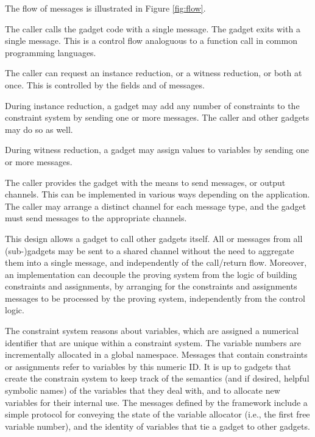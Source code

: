 	The flow of messages is illustrated in Figure \ref{fig:flow}.

	The caller calls the gadget code with a single  message.
	The gadget exits with a single  message.
	This is a control flow analoguous to a function call in common programming languages.

	The caller can request an instance reduction, or a witness reduction, or both at once.
	This is controlled by the fields  and  of  messages.

	During instance reduction,
	a gadget may add any number of constraints to the constraint system
	by sending one or more  messages.
	The caller and other gadgets may do so as well.

	During witness reduction,
	a gadget may assign values to variables
	by sending one or more  messages.

	The caller provides the gadget with the means to send messages,
	or output channels.	This can be implemented in various ways depending
	on the application.
	The caller may arrange a distinct channel for each message type,
	and the gadget must send messages to the appropriate channels.

	This design allows a gadget to call other gadgets itself.
	All  or  messages
	from all (sub-)gadgets may be sent to a shared channel
	without the need to aggregate them into a single message,
	and independently of the call/return flow.
	Moreover, an implementation can decouple the proving system
	from the logic of building constraints and assignments,
	by arranging for the constraints and assignments messages
	to be processed by the proving system, independently from the control logic.

	The constraint system reasons about variables, which are assigned a numerical identifier that are unique within a constraint system. The variable numbers are incrementally allocated in a global namespace. Messages that contain constraints or assignments refer to variables by this numeric ID. It is up to gadgets that create the constrain system to keep track of the semantics (and if desired, helpful symbolic names) of the variables that they deal with, and to allocate new variables for their internal use. The messages defined by the framework include a simple protocol for conveying the state of the variable allocator (i.e., the first free variable number), and the identity of variables that tie a gadget to other gadgets.


